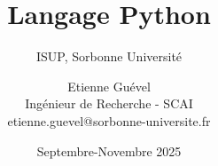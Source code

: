 \title{Langage Python}
\subtitle{ISUP, Sorbonne Université}
\author{Etienne Guével\\Ingénieur de Recherche - SCAI\\\footnotesize{etienne.guevel@sorbonne-universite.fr}}
\date{Septembre-Novembre 2025}
